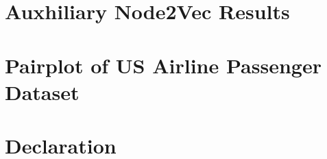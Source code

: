 \documentclass[12pt]{report}
\begin{document}
  \chapter{Auxhiliary Node2Vec Results}
  \label{app:n2v5}
  

  \chapter{Pairplot of US Airline Passenger Dataset}
  \label{App:pairplot}
  

  \chapter*{Declaration}
  
\end{document}
